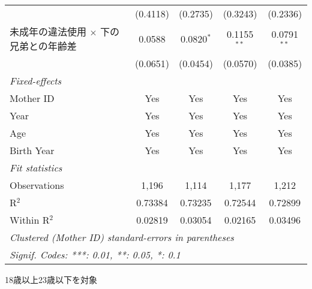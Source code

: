 \documentclass{article}
\begin{document}
\begin{landscape}
\begin{threeparttable}[b]
\begin{tabular}{lcccc}
                                                    & (0.4118)              & (0.2735)     & (0.3243)      & (0.2336)\\   
      未成年の違法使用 $\times$ 下の兄弟との年齢差  & 0.0588                & 0.0820$^{*}$ & 0.1155$^{**}$ & 0.0791$^{**}$\\   
                                                    & (0.0651)              & (0.0454)     & (0.0570)      & (0.0385)\\   
      \midrule
      \emph{Fixed-effects}\\
      Mother ID                                     & Yes                   & Yes          & Yes           & Yes\\  
      Year                                          & Yes                   & Yes          & Yes           & Yes\\  
      Age                                           & Yes                   & Yes          & Yes           & Yes\\  
      Birth Year                                    & Yes                   & Yes          & Yes           & Yes\\  
      \midrule
      \emph{Fit statistics}\\
      Observations                                  & 1,196                 & 1,114        & 1,177         & 1,212\\  
      R$^2$                                         & 0.73384               & 0.73235      & 0.72544       & 0.72899\\  
      Within R$^2$                                  & 0.02819               & 0.03054      & 0.02165       & 0.03496\\  
      \midrule \midrule
      \multicolumn{5}{l}{\emph{Clustered (Mother ID) standard-errors in parentheses}}\\
      \multicolumn{5}{l}{\emph{Signif. Codes: ***: 0.01, **: 0.05, *: 0.1}}\\
   \end{tabular}
   
   \begin{tablenotes}\item 18歳以上23歳以下を対象
   \end{tablenotes}
\end{threeparttable}
\par\endgroup


\end{landscape}
\end{document}
